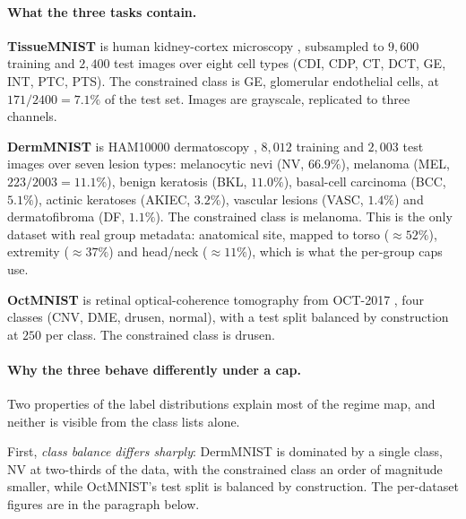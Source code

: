 \documentclass[10pt]{article}
\begin{document}

{
\paragraph{What the three tasks contain.}

\textbf{TissueMNIST} is human kidney-cortex microscopy
\citep{woloshuk2021situ}, subsampled to $9{,}600$ training and $2{,}400$ test
images over eight cell types (CDI, CDP, CT, DCT, GE, INT, PTC, PTS). The
constrained class is GE, glomerular endothelial cells, at $171/2400 = 7.1\%$ of
the test set. Images are grayscale, replicated to three channels.

\textbf{DermMNIST} is HAM10000 dermatoscopy \citep{tschandl2018ham10000},
$8{,}012$ training and $2{,}003$ test images over seven lesion types: melanocytic
nevi (NV, $66.9\%$), melanoma (MEL, $223/2003 = 11.1\%$), benign keratosis (BKL, $11.0\%$),
basal-cell carcinoma (BCC, $5.1\%$), actinic keratoses (AKIEC, $3.2\%$),
vascular lesions (VASC, $1.4\%$) and dermatofibroma (DF, $1.1\%$). The
constrained class is melanoma. This is the only dataset with real group
metadata: anatomical site, mapped to torso ($\approx52\%$), extremity
($\approx37\%$) and head/neck ($\approx11\%$), which is what the per-group caps
use.

\textbf{OctMNIST} is retinal optical-coherence tomography from OCT-2017
\citep{kermany2018identifying}, four classes (CNV, DME, drusen, normal), with a
test split balanced by construction at $250$ per class. The
constrained class is drusen.

\paragraph{Why the three behave differently under a cap.}
Two properties of the label distributions explain most of the regime map, and
neither is visible from the class lists alone.

First, \emph{class balance differs sharply}: DermMNIST is dominated by a single
class, NV at two-thirds of the data, with the constrained class an order of
magnitude smaller, while OctMNIST's test split is balanced by construction. The
per-dataset figures are in the paragraph below.

}
\end{document}
